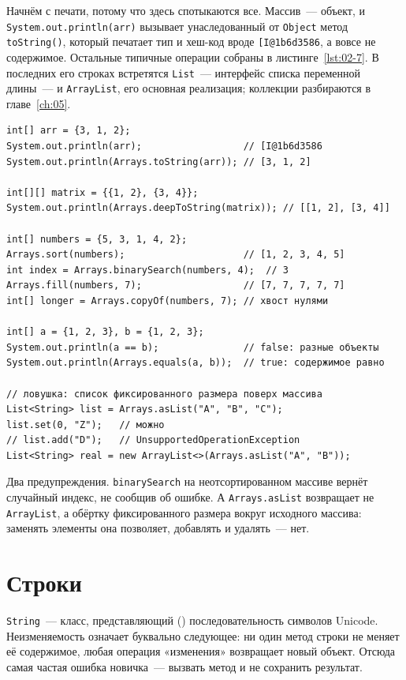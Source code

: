 Начнём с печати, потому что здесь спотыкаются все. Массив~--- объект, и
\texttt{System.out.println(arr)} вызывает унаследованный от \texttt{Object}
метод \texttt{toString()}, который печатает тип и хеш-код вроде
\texttt{[I@1b6d3586}, а вовсе не содержимое. Остальные типичные операции
собраны в листинге~\ref{lst:02-7}. В последних его строках встретятся
\texttt{List}~--- интерфейс списка переменной длины~--- и \texttt{ArrayList},
его основная реализация; коллекции разбираются в главе~\ref{ch:05}.

\begin{listing}[H]
\begin{verbatim}
int[] arr = {3, 1, 2};
System.out.println(arr);                  // [I@1b6d3586
System.out.println(Arrays.toString(arr)); // [3, 1, 2]

int[][] matrix = {{1, 2}, {3, 4}};
System.out.println(Arrays.deepToString(matrix)); // [[1, 2], [3, 4]]

int[] numbers = {5, 3, 1, 4, 2};
Arrays.sort(numbers);                     // [1, 2, 3, 4, 5]
int index = Arrays.binarySearch(numbers, 4);  // 3
Arrays.fill(numbers, 7);                  // [7, 7, 7, 7, 7]
int[] longer = Arrays.copyOf(numbers, 7); // хвост нулями

int[] a = {1, 2, 3}, b = {1, 2, 3};
System.out.println(a == b);               // false: разные объекты
System.out.println(Arrays.equals(a, b));  // true: содержимое равно

// ловушка: список фиксированного размера поверх массива
List<String> list = Arrays.asList("A", "B", "C");
list.set(0, "Z");   // можно
// list.add("D");   // UnsupportedOperationException
List<String> real = new ArrayList<>(Arrays.asList("A", "B"));
\end{verbatim}
\caption{Работа с массивами через класс Arrays}
\label{lst:02-7}
\end{listing}

Два предупреждения. \texttt{binarySearch} на неотсортированном массиве вернёт
случайный индекс, не сообщив об ошибке. А \texttt{Arrays.asList} возвращает не
\texttt{ArrayList},
а обёртку фиксированного размера вокруг исходного массива: заменять элементы
она позволяет, добавлять и удалять~--- нет.

\section{Строки}

\texttt{String}~--- класс, представляющий 
() последовательность символов Unicode. Неизменяемость означает
буквально следующее: ни один метод строки не меняет её содержимое, любая
операция «изменения» возвращает новый объект. Отсюда самая частая ошибка
новичка~--- вызвать метод и не сохранить результат.

